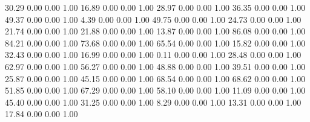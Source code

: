    30.29   0.00   0.00   1.00
   16.89   0.00   0.00   1.00
   28.97   0.00   0.00   1.00
   36.35   0.00   0.00   1.00
   49.37   0.00   0.00   1.00
    4.39   0.00   0.00   1.00
   49.75   0.00   0.00   1.00
   24.73   0.00   0.00   1.00
   21.74   0.00   0.00   1.00
   21.88   0.00   0.00   1.00
   13.87   0.00   0.00   1.00
   86.08   0.00   0.00   1.00
   84.21   0.00   0.00   1.00
   73.68   0.00   0.00   1.00
   65.54   0.00   0.00   1.00
   15.82   0.00   0.00   1.00
   32.43   0.00   0.00   1.00
   16.99   0.00   0.00   1.00
    0.11   0.00   0.00   1.00
   28.48   0.00   0.00   1.00
   62.97   0.00   0.00   1.00
   56.27   0.00   0.00   1.00
   48.88   0.00   0.00   1.00
   39.51   0.00   0.00   1.00
   25.87   0.00   0.00   1.00
   45.15   0.00   0.00   1.00
   68.54   0.00   0.00   1.00
   68.62   0.00   0.00   1.00
   51.85   0.00   0.00   1.00
   67.29   0.00   0.00   1.00
   58.10   0.00   0.00   1.00
   11.09   0.00   0.00   1.00
   45.40   0.00   0.00   1.00
   31.25   0.00   0.00   1.00
    8.29   0.00   0.00   1.00
   13.31   0.00   0.00   1.00
   17.84   0.00   0.00   1.00
